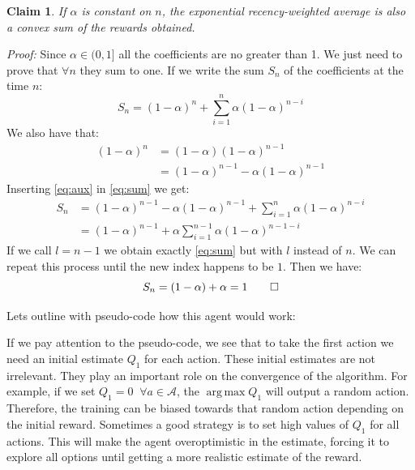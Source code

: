 \documentclass[11pt,a4paper,twoside]{report}
\DeclareMathOperator*{\argmax}{arg\,max}
\newcommand{\+}{\textnormal{+} }
\newtheorem{myclaim}[mythm]{Claim}
\theoremstyle{definition}
\numberwithin{equation}{chapter}
\begin{document}
\begin{myclaim}

  If $\alpha$ is constant on $n$, the exponential recency-weighted average is
  also a convex sum of the rewards obtained.
  \\
\end{myclaim}
  \textit{Proof:} Since $\alpha \in (0,1]$ all the coefficients are no greater
  than 1. We just need to prove that $\forall n$ they sum to one. If we write 
  the sum $S_n$ of the coefficients at the time $n$:
  \begin{equation}
    S_n=(1-\alpha)^{n} + \sum_{i=1}^{n} \alpha(1-\alpha)^{n-i}
    \label{eq:sum}
  \end{equation}
  We also have that: 
  \begin{align}
    (1-\alpha)^n &= (1-\alpha)(1-\alpha)^{n-1} \\
    &=(1-\alpha)^{n-1}-\alpha(1-\alpha)^{n-1}
    \label{eq:aux}
  \end{align}
  Inserting \eqref{eq:aux} in \eqref{eq:sum} we get:
  \begin{align}
    S_n&=(1-\alpha)^{n-1}-\alpha(1-\alpha)^{n-1}+\sum_{i=1}^{n} \alpha(1-\alpha)^{n-i}\\
    &=(1-\alpha)^{n-1} + \alpha \sum_{i=1}^{n-1} \alpha(1-\alpha)^{n-1-i}
  \end{align}
  If we call $l=n-1$ we obtain exactly \eqref{eq:sum} but with $l$ instead of 
  $n$. We can repeat this process until the new index happens to be $1$. Then
  we have:
  \begin{equation}
  S_n = (1-\alpha) + \alpha = 1 \qed 
\end{equation}

Lets outline with pseudo-code how this agent would work:

\makeatletter
\def\BState{\State\hskip-\ALG@thistlm}
\makeatother
\begin{algorithm}
  \caption{}\label{Non-stationary multiarmed-bandit}
  \end{algorithm}

  If we pay attention to the pseudo-code, we see that to take the first action
  we need an initial estimate $Q_1$ for each action. These initial estimates
  are not irrelevant. They play an important role on the convergence of the
  algorithm. For example, if we set $Q_1=0 \; \; \forall a \in \mathcal{A}$, the
  $\argmax Q_1$ will output a random action. Therefore, the training can be
  biased towards that random action depending on the initial reward. Sometimes a
  good strategy is to set high values of $Q_1$ for all actions. This will make
  the agent overoptimistic in the estimate, forcing it to explore all options
  until getting a more realistic estimate of the reward.
\end{document}
